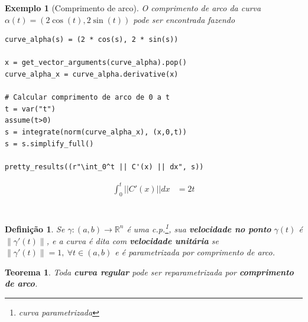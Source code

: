 \documentclass[12pt]{article}
\newtheorem{ex}{Exemplo}[section]
\newtheorem{theorem}{Teorema}
\newtheorem{definition}{Definição}
\begin{document}
\begin{ex}[Comprimento de arco] O comprimento de arco da curva $\alpha(t) = (2 \cos(t), 2 \sin(t))$ pode ser encontrada fazendo
\begin{lstlisting}
curve_alpha(s) = (2 * cos(s), 2 * sin(s))

x = get_vector_arguments(curve_alpha).pop()
curve_alpha_x = curve_alpha.derivative(x)
    
# Calcular comprimento de arco de 0 a t
t = var("t")
assume(t>0)
s = integrate(norm(curve_alpha_x), (x,0,t))
s = s.simplify_full()

pretty_results((r"\int_0^t || C'(x) || dx", s))
\end{lstlisting}

\newcommand{\Bold}[1]{\mathbf{#1}}\begin{align*} \int_0^t || C'(x) || dx &= 2t \\ \end{align*} \\
\end{ex}

\begin{definition}
Se $\gamma: (a, b) \rightarrow \mathbb{R}^n$ é uma c.p.\footnote{curva parametrizada}, sua \textbf{velocidade no ponto} $\gamma(t)$ é $\| \gamma'(t) \|$, e a curva é dita com \textbf{velocidade unitária} se $\| \gamma'(t) \| = 1,\ \forall t \in (a, b)$ e é parametrizada por comprimento de arco.
\end{definition}

\begin{theorem}
Toda \textbf{curva regular} pode ser reparametrizada por \textbf{comprimento de arco}.
\end{theorem}



\end{document}

